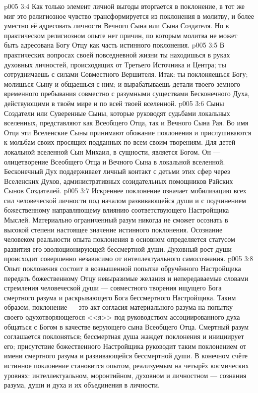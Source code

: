 \vs p005 3:4 Как только элемент личной выгоды вторгается в поклонение, в тот же миг это религиозное чувство трансформируется из поклонения в молитву, и более уместно её адресовать личности Вечного Сына или Сына Создателя. Но в практическом религиозном опыте нет причин, по которым молитва не может быть адресована Богу Отцу как часть истинного поклонения.
\vs p005 3:5 В практических вопросах своей повседневной жизни ты находишься в руках духовных личностей, происходящих от Третьего Источника и Центра; ты сотрудничаешь с силами Совместного Вершителя. Итак: ты поклоняешься Богу; молишься Сыну и общаешься с ним; и вырабатываешь детали твоего земного временного пребывания совместно с разумными существами Бесконечного Духа, действующими в твоём мире и по всей твоей вселенной.
\vs p005 3:6 \pc Сыны Создатели или Суверенные Сыны, которые руководят судьбами локальных вселенных, представляют как Всеобщего Отца, так и Вечного Сына Рая. Во имя Отца эти Вселенские Сыны принимают обожание поклонения и прислушиваются к мольбам своих просящих подданных по всем своим творениям. Для детей локальной вселенной Сын Михаил, в сущности, является Богом. Он --- олицетворение Всеобщего Отца и Вечного Сына в локальной вселенной. Бесконечный Дух поддерживает личный контакт с детьми этих сфер через Вселенских Духов, административных созидательных помощников Райских Сынов Создателей.
\vs p005 3:7 \pc Искреннее поклонение означает мобилизацию всех сил человеческой личности под началом развивающейся души и с подчинением божественному направляющему влиянию соответствующего Настройщика Мыслей. Материально ограниченный разум никогда не сможет осознать в высокой степени настоящее значение истинного поклонения. Осознание человеком реальности опыта поклонения в основном определяется статусом развития его эволюционирующей бессмертной души. Духовный рост души происходит совершенно независимо от интеллектуального самосознания.
\vs p005 3:8 Опыт поклонения состоит в возвышенной попытке обручённого Настройщика передать божественному Отцу невыразимые желания и непередаваемые словами стремления человеческой души --- совместного творения ищущего Бога смертного разума и раскрывающего Бога бессмертного Настройщика. Таким образом, поклонение --- это акт согласия материального разума на попытку своего одухотворяющегося <<я>> под руководством ассоциированного духа общаться с Богом в качестве верующего сына Всеобщего Отца. Смертный разум соглашается поклоняться; бессмертная душа жаждет поклонения и инициирует его; присутствие божественного Настройщика руководит таким поклонением от имени смертного разума и развивающейся бессмертной души. В конечном счёте истинное поклонение становится опытом, реализуемым на четырёх космических уровнях: интеллектуальном, моронтийном, духовном и личностном --- сознания разума, души и духа и их объединения в личности.
